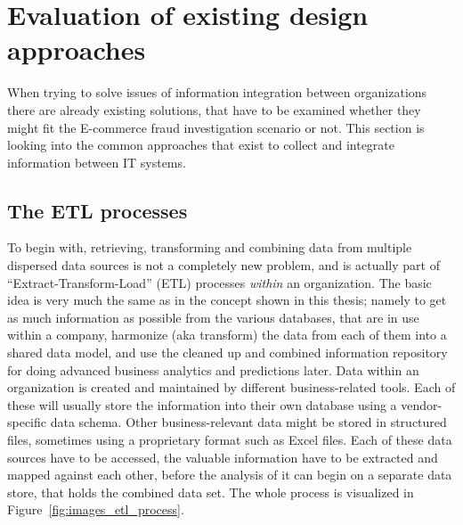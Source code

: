
\section{Evaluation of existing design approaches}
\label{sec:system_approaches}

When trying to solve issues of information integration between organizations there are already existing solutions, that have to be examined whether they might fit the \gls{E-commerce} fraud investigation scenario or not. This section is looking into the common approaches that exist to collect and integrate information between \gls{IT} systems.

\subsection{The \gls{ETL} processes}
\label{subsec:etl_process}

To begin with, retrieving, transforming and combining data from multiple dispersed data sources is not a completely new problem, and is actually part of ``Extract-Transform-Load'' (\gls{ETL}) processes \emph{within} an organization. The basic idea is very much the same as in the concept shown in this thesis; namely to get as much information as possible from the various databases, that are in use within a company, harmonize (aka transform) the data from each of them into a shared data model, and use the cleaned up and combined information repository for doing advanced business analytics and predictions later. Data within an organization is created and maintained by different business-related tools. Each of these will usually store the information into their own database using a vendor-specific data schema. Other business-relevant data might be stored in structured files, sometimes using a proprietary format such as Excel files. Each of these data sources have to be accessed, the valuable information have to be extracted and mapped against each other, before the analysis of it can begin on a separate data store, that holds the combined data set. The whole process is visualized in Figure~\ref{fig:images_etl_process}. \\

